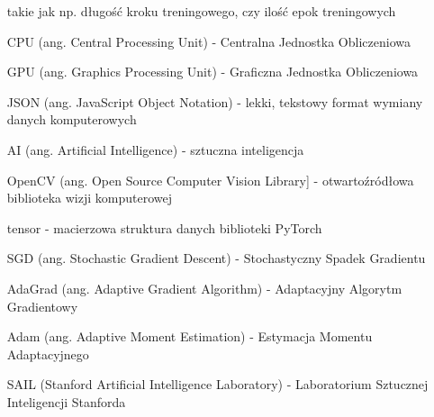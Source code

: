 \begin{itemize}
    takie jak np. długość kroku treningowego, czy ilość epok treningowych
    \item[CPU] (ang. Central Processing Unit) - Centralna Jednostka Obliczeniowa
    \item[GPU] (ang. Graphics Processing Unit) - Graficzna Jednostka Obliczeniowa
    \item[JSON] (ang. JavaScript Object Notation) - lekki, tekstowy format wymiany danych komputerowych
    \item[AI] (ang. Artificial Intelligence) - sztuczna inteligencja
    \item[OpenCV] (ang. Open Source Computer Vision Library] - otwartoźródłowa biblioteka wizji komputerowej
    \item[tensor] - macierzowa struktura danych biblioteki PyTorch
    \item[SGD] (ang. Stochastic Gradient Descent) - Stochastyczny Spadek Gradientu
    \item[AdaGrad] (ang. Adaptive Gradient Algorithm) - Adaptacyjny Algorytm Gradientowy
    \item[Adam] (ang. Adaptive Moment Estimation) - Estymacja Momentu Adaptacyjnego
    \item[SAIL] (Stanford Artificial Intelligence Laboratory) - Laboratorium Sztucznej Inteligencji Stanforda


  \end{itemize}

